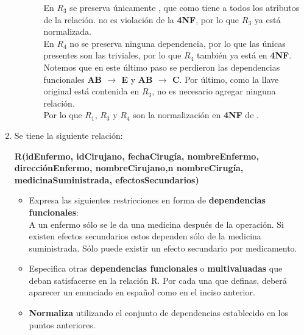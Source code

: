 \documentclass{article}
\begin{document}
\begin{enumerate}
\begin{itemize}
\begin{enumerate}
    	    En $R_3$ se preserva únicamente ,
    	    que como tiene a todos los atributos de la relación. no es 
    	    violación de la \textbf{4NF}, por lo que $R_3$ ya está
    	    normalizada.\\
    	    En $R_4$ no se preserva ninguna dependencia, por lo que las
    	    únicas presentes son las triviales, por lo que $R_4$ también
    	    ya está en \textbf{4NF}.\\
    	    Notemos que en este último paso se perdieron las dependencias
    	    funcionales \textbf{AB $\rightarrow$ E} y \textbf{AB
    	    $\rightarrow$ C}.
    	    Por último, como la llave original está contenida en $R_3$, 
    	    no es necesario agregar ninguna relación.\\
    	    Por lo que $R_1$, $R_3$ y $R_4$ son la normalización en
    	    \textbf{4NF} de .
    	    
    	\end{enumerate}
    \end{itemize}
    
    	\item Se tiene la siguiente relación:   	
    	\begin{center}
    		 \textbf{R(idEnfermo, idCirujano, fechaCirugía, nombreEnfermo, direcciónEnfermo, nombreCirujano,n nombreCirugía, medicinaSuministrada, efectosSecundarios)}
    	\end{center}	 
    	
    	\begin{itemize}
    	\item Expresa las siguientes restricciones en forma de \textbf{dependencias funcionales}:\\
    	A un enfermo sólo se le da una medicina después de la operación. Si existen efectos secundarios estos dependen sólo de la medicina suministrada. Sólo puede existir un efecto secundario por medicamento.
    	\item Especifica  otras \textbf{dependencias  funcionales} o \textbf{multivaluadas} que  deban  satisfacerse  en  la relación R. Por cada una que definas, deberá aparecer un enunciado en español como en el inciso anterior.
    	\item \textbf{Normaliza} utilizando el conjunto de dependencias establecido en los puntos anteriores.
    \end{itemize}
    	
\end{enumerate}
\end{document}

